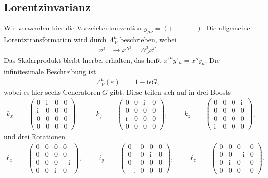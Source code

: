 \documentclass[english, parskip=full]{scrreport}
\renewcommand{\i}{\text{i}}
\begin{document}
\subsection{Lorentzinvarianz}
Wir verwenden hier die Vorzeichenkonvention $g_{\mu\nu} = (+---)$.
Die allgemeine Lorentztransformation wird durch $\Lambda^\mu_{\ \nu}$ beschrieben, wobei
\begin{align}
x^\mu&\rightarrow x'^\mu = \Lambda^\mu_{\ \nu} x^\nu.
\end{align}
Das Skalarprodukt bleibt hierbei erhalten, das heißt $x'^\mu y'_\mu = x^\mu y_\mu$.
Die infinitesimale Beschreibung ist
\begin{align}
\Lambda^\mu_{\ \nu} (\varepsilon) &= 1 - \i\epsilon G,
\end{align}
wobei es hier sechs Generatoren $G$ gibt.
Diese teilen sich auf in drei Boosts
\begin{align}
k_x &= \begin{pmatrix}
0&\i&0&0 \\ \i&0&0&0 \\ 0&0&0&0 \\ 0&0&0&0
\end{pmatrix}, &&& k_y &= \begin{pmatrix}
0&0&\i&0 \\ 0&0&0&0 \\ \i&0&0&0 \\ 0&0&0&0
\end{pmatrix}, &&& k_z &= \begin{pmatrix}
0&0&0&\i \\ 0&0&0&0 \\ 0&0&0&0 \\ \i&0&0&0
\end{pmatrix}, 
\end{align}
und drei Rotationen
\begin{align}
\ell_x &= \begin{pmatrix}
0&0&0&0 \\ 0&0&0&0 \\ 0&0&0&-\i \\ 0&0&\i&0
\end{pmatrix}, &&& \ell_y &= \begin{pmatrix}
0&0&0&0 \\ 0&0&\i&0 \\ 0&0&0&0 \\ -\i&0&0&0
\end{pmatrix}, &&& \ell_z &= \begin{pmatrix}
0&0&0&0 \\ 0&0&-\i&0 \\ 0&\i&0&0 \\ 0&0&0&0
\end{pmatrix}.
\end{align}
\end{document}

